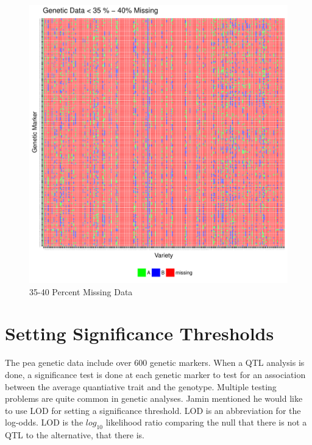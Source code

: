\documentclass[11pt]{article}\usepackage[]{graphicx}\usepackage[]{color}
\makeatletter
\def\maxwidth{ %
  \ifdim\Gin@nat@width>\linewidth
    \linewidth
  \else
    \Gin@nat@width
  \fi
}
\newenvironment{knitrout}{}{} %
\makeatother
\begin{document}
\begin{knitrout}\footnotesize
{}\color{fgcolor}\begin{figure}[H]

{\centering \includegraphics[width=\maxwidth]{figure/missing_plot40-1} 

}

\caption[35-40 Percent Missing Data]{35-40 Percent Missing Data}\label{fig:missing.plot40}
\end{figure}


\end{knitrout}

\newpage



\newpage










\section{Setting Significance Thresholds}

The pea genetic data include over 600 genetic markers. When a QTL analysis is done, a significance test is done at each genetic marker to test for an association between the average quantiative trait and the genotype. Multiple testing problems are quite common in genetic analyses. Jamin mentioned he would like to use LOD for setting a significance threshold. LOD is an abbreviation for the log-odds. LOD is the $log_{10}$ likelihood ratio comparing the null that there is not a QTL to the alternative, that there is.
\end{document}
